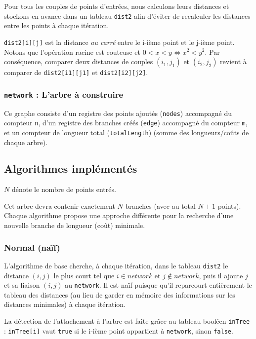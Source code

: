 \documentclass[10pt,a4paper]{article}
\begin{document}
Pour tous les couples de points d'entrées, nous calculons leurs distances et stockons en avance dans un tableau \texttt{dist2} afin d'éviter de recalculer les distances entre les points à chaque itération.

\texttt{dist2[i][j]} est la distance \emph{au carré} entre le i-ième point et le j-ième point. Notons que l'opération racine est couteuse et $0<x<y \Leftrightarrow x^2 < y^2$. Par conséquence, comparer deux distances de couples $(i_1, j_1)$ et $(i_2, j_2)$ revient à comparer de \texttt{dist2[i1][j1]} et \texttt{dist2[i2][j2]}.

\subsubsection{\texttt{network} : L'arbre à construire}

Ce graphe consiste d'un registre des points ajoutés (\texttt{nodes}) accompagné du compteur \texttt{n}, d'un registre des branches créés (\texttt{edge}) accompagné du compteur \texttt{m}, et un compteur de longueur total (\texttt{totalLength}) (somme des longueurs/coûts de chaque arbre).

\subsection{Algorithmes implémentés}

$N$ dénote le nombre de points entrés.

Cet arbre devra contenir exactement $N$ branches (avec au total $N+1$ points). Chaque algorithme propose une approche différente pour la recherche d'une nouvelle branche de longueur (coût) minimale.

\subsubsection{Normal (naïf)}

L'algorithme de base cherche, à chaque itération, dans le tableau \texttt{dist2} le distance $(i,j)$ le plus court tel que $i \in network$ et $j \not \in network$, puis il ajoute $j$ et sa liaison $(i,j)$ au \texttt{network}. Il est naïf puisque qu'il  reparcourt entièrement le tableau des distances (au lieu de garder en mémoire des informations sur les distances minimales) à chaque itération.

La détection de l'attachement à l'arbre est faite grâce au tableau booléen \texttt{inTree} : \texttt{inTree[i]} vaut \texttt{true} si le i-ième point appartient à \texttt{network}, sinon \texttt{false}.
\end{document}
